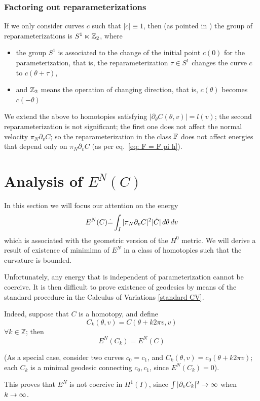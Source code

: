 \documentclass[twoside,a4paper,english]{article}
\def\derpar#1{\partial_{#1}}
\begin{document}
\subsubsection{Factoring out reparameterizations}


If we only consider curves $c$ such that $|\dot c|\equiv 1$, then
(as pointed in \cite{Michor-Mumford})
the group of reparameterizations is $S^1\ltimes {\protect\mathbb{Z}}_2$, where
\begin{itemize}
\item the group  $S^1$ is associated to the change of the initial
  point  $c(0)$ for the  parameterization, that is, 
  the reparameterization $\tau\in  S^1$ changes  the curve $c$ to
  $c(\theta+\tau)$,
\item  and  ${\protect\mathbb{Z}}_2$ means the operation of changing direction,
  that is, $c(\theta)$ becomes  $c(-\theta)$
\end{itemize}

We extend the above to homotopies satisfying 
$|\derpar\theta C(\theta,v)|=l(v)$;
the second reparameterization is not significant;  the first one
does not affect the normal velocity $\pi_N\derpar v C$;
so the reparameterization in the class ${\mathbb F}$
does not affect energies that depend only on $\pi_N\derpar v C$
(as per eq.~\eqref{eq: F = F pi h}).



\section{Analysis of $E^N(C)$}
\label{sec: ana}

In this section we will focus our attention on the energy 
\[ E^N(C) \defeq \int_{I}  |\pi_N \derpar v C|^2 |\dot C| \, d\theta \,dv  \]
which is associated with the geometric version of the $H^0$ metric.
We will derive a result of existence of minimima of $E^N$ in
a class of homotopies such that the curvature is  bounded.

\begin{Remark}[winding]\label{exa: E N not coerc}
  Unfortunately, any energy that is independent of parameterization
  cannot be coercive. It is then difficult to prove existence of geodesics
  by means of the standard procedure in the Calculus of Variations
  \ref{standard CV}.

  Indeed, suppose that $C$ is a homotopy, and define
  $$  C_k(\theta,v) = C(\theta+k2\pi v,v)$$  
  $\forall k\in\mathbb Z$; then
  \[ E^N(C_k) = E^N(C) \]

  (As a special case, consider two curves $c_0=c_1$, and
  $C_k(\theta,v)=c_0(\theta+k2\pi v)$; each $C_k$
  is a  minimal geodesic connecting $c_0,c_1$, since $E^N(C_k)=0$).

  This proves that $E^N$ is not coercive in $H^1(I)$, since
  $\int |\derpar v C_k|^2\to \infinity $ when $k\to\infty$.
\end{Remark}
\end{document}
